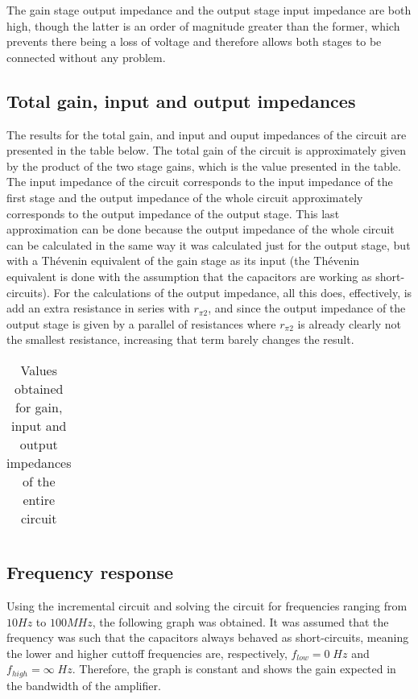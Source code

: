 

The gain stage output impedance and the output stage input impedance are both high, though the latter is an order of magnitude greater than the former, which prevents there being a loss of voltage and therefore allows both stages to be connected without any problem.



\subsection{Total gain, input and output impedances}

The results for the total gain, and input and ouput impedances of the circuit are presented in the table below. The total gain of the circuit is approximately given by the product of the two stage gains, which is the value presented in the table. The input impedance of the circuit corresponds to the input impedance of the first stage and the output impedance of the whole circuit approximately corresponds to the output impedance of the output stage.
This last approximation can be done because the output impedance of the whole circuit can be calculated in the same way it was calculated just for the output stage, but with a Thévenin equivalent of the gain stage as its input (the Thévenin equivalent is done with the assumption that the capacitors are working as short-circuits). For the calculations of the output impedance, all this does, effectively, is add an extra resistance in series with $r_{\pi2}$, and since the output impedance of the output stage is given by a parallel of resistances where $r_{\pi2}$ is already clearly not the smallest resistance, increasing that term barely changes the result.

\begin{table}[H]
  \centering
  \begin{tabular}{|c|c|}
    \hline
      
  \end{tabular}
  \caption{Values obtained for gain, input and output impedances of the entire circuit}
  \label{tab:resultsAC2}
\end{table}


\subsection{Frequency response}
Using the incremental circuit and solving the circuit for frequencies ranging from $10 Hz$ to $100 MHz$, the following graph was obtained. It was assumed that the frequency was such that the capacitors always behaved as short-circuits, meaning the lower and higher cuttoff frequencies are, respectively, $f_{low} = 0 \;Hz$ and $f_{high} = \infty \;Hz$. Therefore, the graph is constant and shows the gain expected in the bandwidth of the amplifier.

